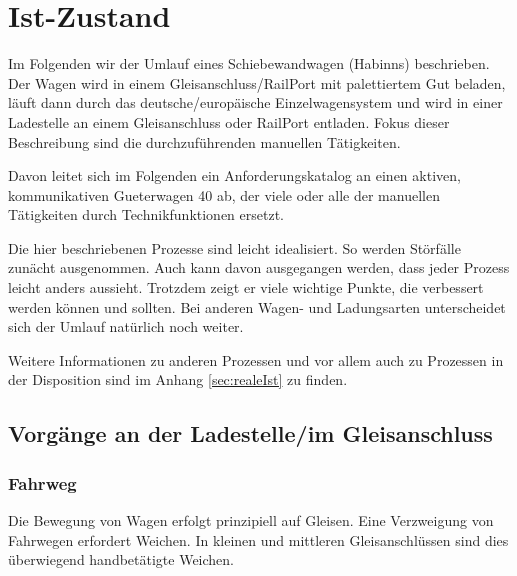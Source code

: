 \section{Ist-Zustand}\label{sec:Istzustand} %
Im Folgenden wir der Umlauf eines \gls{Schiebewandwagen} (Habinns) beschrieben. Der Wagen wird in einem \gls{Gleisanschluss}/\gls{RailPort} mit palettiertem Gut beladen, läuft dann durch das deutsche/europäische Einzelwagensystem und wird in einer Ladestelle an einem \gls{Gleisanschluss} oder \gls{RailPort} entladen. Fokus dieser Beschreibung sind die durchzuführenden manuellen Tätigkeiten.\par
Davon leitet sich im Folgenden ein Anforderungskatalog an einen aktiven, kommunikativen \gls{Gueterwagen 40} ab, der viele oder alle der manuellen Tätigkeiten durch Technikfunktionen ersetzt.\par
Die hier beschriebenen Prozesse sind leicht idealisiert. So werden Störfälle zunächt ausgenommen. Auch kann davon ausgegangen werden, dass jeder Prozess leicht anders aussieht. Trotzdem zeigt er viele wichtige Punkte, die verbessert werden können und sollten. Bei anderen Wagen- und Ladungsarten unterscheidet sich der Umlauf natürlich noch weiter.\par
Weitere Informationen zu anderen Prozessen und vor allem auch zu Prozessen in der Disposition sind im Anhang \ref{sec:realeIst} zu finden. \par
\subsection{Vorgänge an der Ladestelle/im Gleisanschluss}\label{sec:Ladestelle}
\subsubsection{Fahrweg} \label{sec:Fahrweg}
Die Bewegung von Wagen erfolgt prinzipiell auf Gleisen. Eine Verzweigung von Fahrwegen erfordert Weichen. In kleinen und mittleren Gleisanschlüssen sind dies überwiegend handbetätigte Weichen. 
